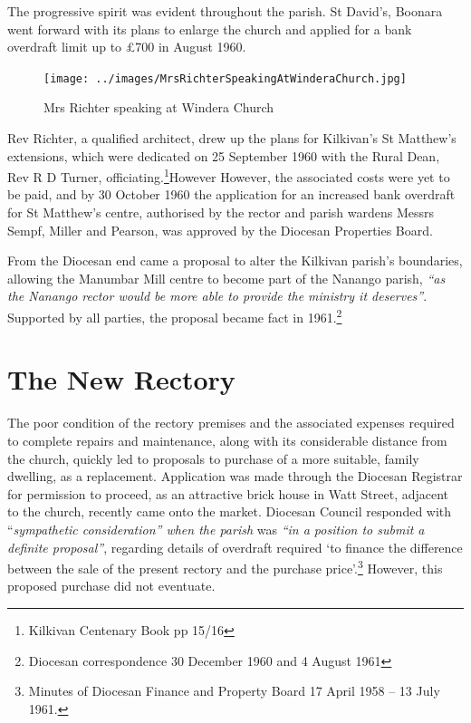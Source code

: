 The progressive spirit was evident throughout the parish. St David's, Boonara went forward with its plans to enlarge the church and applied for a bank overdraft limit up to \pounds700 in August 1960.









\begin{figure}[!htb]
\begin{center}
\texttt{[image: ../images/MrsRichterSpeakingAtWinderaChurch.jpg]}
\caption{Mrs Richter speaking at Windera Church}
\end{center}
\end{figure}




Rev Richter, a qualified architect, drew up the plans for Kilkivan's St Matthew's extensions, which were dedicated on 25 September 1960 with the Rural Dean, Rev R D Turner, officiating.\footnote{Kilkivan Centenary Book pp 15/16}However However, the associated costs were yet to be paid, and by 30 October 1960 the application for an increased bank overdraft for St Matthew's centre, authorised by the rector and parish wardens Messrs Sempf, Miller and Pearson, was approved by the Diocesan Properties Board.


From the Diocesan end came a proposal to alter the Kilkivan parish's boundaries, allowing the Manumbar Mill centre to become part of the Nanango parish, \emph{``as the Nanango rector would be more able to provide the ministry it deserves''}. Supported by all parties, the proposal became fact in 1961.\footnote{Diocesan correspondence 30 December 1960 and 4 August 1961}


\section{The New Rectory}



The poor condition of the rectory premises and the associated expenses required to complete repairs and maintenance, along with its considerable distance from the church, quickly led to proposals to purchase of a more suitable, family dwelling, as a replacement. Application was made through the Diocesan Registrar for permission to proceed, as an attractive brick house in Watt Street, adjacent to the church, recently came onto the market. Diocesan Council responded with ``\emph{sympathetic consideration'' when the parish} was \emph{``in a position to submit a definite proposal''}, regarding details of overdraft required `to finance the difference between the sale of the present rectory and the purchase price'.\footnote{Minutes of Diocesan Finance and Property Board 17 April 1958 -- 13 July 1961.} However, this proposed purchase did not eventuate.








